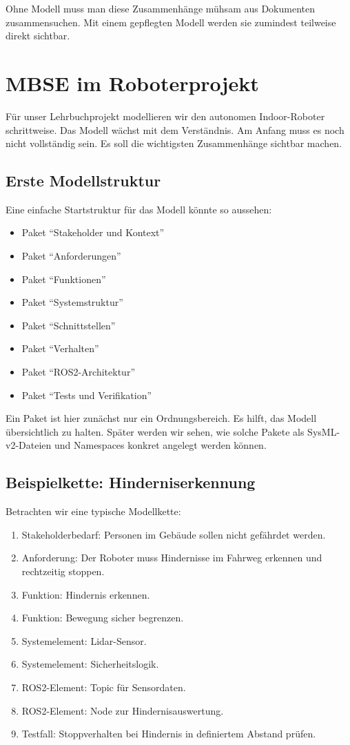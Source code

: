 Ohne Modell muss man diese Zusammenhänge mühsam aus Dokumenten zusammensuchen. Mit einem gepflegten Modell werden sie zumindest teilweise direkt sichtbar.

\section{MBSE im Roboterprojekt}
Für unser Lehrbuchprojekt modellieren wir den autonomen Indoor-Roboter schrittweise. Das Modell wächst mit dem Verständnis. Am Anfang muss es noch nicht vollständig sein. Es soll die wichtigsten Zusammenhänge sichtbar machen.

\subsection{Erste Modellstruktur}
Eine einfache Startstruktur für das Modell könnte so aussehen:

\begin{itemize}
    \item Paket \enquote{Stakeholder und Kontext}
    \item Paket \enquote{Anforderungen}
    \item Paket \enquote{Funktionen}
    \item Paket \enquote{Systemstruktur}
    \item Paket \enquote{Schnittstellen}
    \item Paket \enquote{Verhalten}
    \item Paket \enquote{ROS2-Architektur}
    \item Paket \enquote{Tests und Verifikation}
\end{itemize}

Ein Paket ist hier zunächst nur ein Ordnungsbereich. Es hilft, das Modell übersichtlich zu halten. Später werden wir sehen, wie solche Pakete als SysML-v2-Dateien und Namespaces konkret angelegt werden können.

\subsection{Beispielkette: Hinderniserkennung}
Betrachten wir eine typische Modellkette:

\begin{enumerate}
    \item Stakeholderbedarf: Personen im Gebäude sollen nicht gefährdet werden.
    \item Anforderung: Der Roboter muss Hindernisse im Fahrweg erkennen und rechtzeitig stoppen.
    \item Funktion: Hindernis erkennen.
    \item Funktion: Bewegung sicher begrenzen.
    \item Systemelement: Lidar-Sensor.
    \item Systemelement: Sicherheitslogik.
    \item ROS2-Element: Topic für Sensordaten.
    \item ROS2-Element: Node zur Hindernisauswertung.
    \item Testfall: Stoppverhalten bei Hindernis in definiertem Abstand prüfen.
\end{enumerate}

